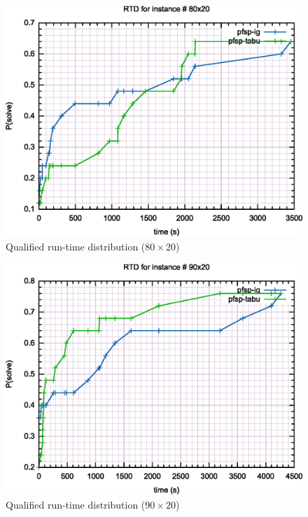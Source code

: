 \begin{figure}[H]
	\centering
	\includegraphics[width=\textwidth]{fig/qrd/80x20}
	\caption{Qualified run-time distribution ($80 \times 20$)}
\end{figure}

\begin{figure}[H]
	\centering
	\includegraphics[width=\textwidth]{fig/qrd/90x20}
	\caption{Qualified run-time distribution ($90 \times 20$)}
\end{figure}